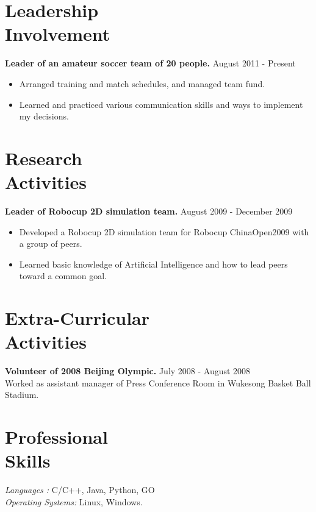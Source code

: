 \documentclass[margin]{res}
\begin{document}
\begin{resume}
 \section{Leadership \\ Involvement} 
				{ \bf Leader of an amateur soccer team of 20 people.} \hfill August 2011 - Present \\           
                 \begin{itemize}  \itemsep -2pt %
                 \item Arranged training and match schedules, and managed team fund. 
                \item  Learned and practiced various communication skills and ways to implement my decisions.
                \end{itemize}

\section{Research \\ Activities} 
				{ \bf Leader of Robocup 2D simulation team.} \hfill August 2009 - December 2009 \\  								
                 \begin{itemize}  \itemsep -2pt %
                 \item Developed a Robocup 2D simulation team for Robocup ChinaOpen2009 with a group of peers. 
                \item  Learned basic knowledge of Artificial Intelligence and how to lead peers toward a common goal.
                \end{itemize}

\section{Extra-Curricular \\ Activities} 
				{ \bf Volunteer of 2008 Beijing Olympic.} \hfill July 2008 - August 2008 \\  		
                 Worked as assistant manager of Press Conference Room in Wukesong Basket Ball Stadium.
 
 \section{Professional \\ Skills} {\sl Languages :} C/C++, Java, Python, GO\\
                {\sl Operating Systems:} Linux, Windows.
 

\end{resume}
\end{document}
